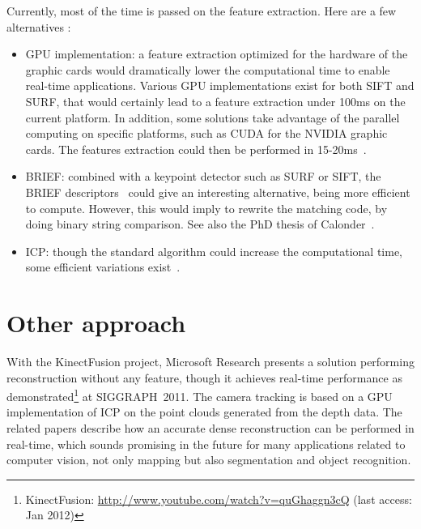 Currently, most of the time is passed on the feature extraction. Here are a few alternatives :
\begin{itemize}
\item GPU implementation: a feature extraction optimized for the hardware of the graphic cards would dramatically lower the computational time to enable real-time applications. Various GPU implementations exist for both SIFT and SURF, that would certainly lead to a feature extraction under 100ms on the current platform. In addition, some solutions take advantage of the parallel computing on specific platforms, such as CUDA\texttrademark{} for the NVIDIA graphic cards. The features extraction could then be performed in 15-20ms~\cite{bjorkman}.
\item BRIEF: combined with a keypoint detector such as \gls{SURF} or \gls{SIFT}, the \gls{BRIEF} descriptors~\cite{Calonder10-brief} could give an interesting alternative, being more efficient to compute. However, this would imply to rewrite the matching code, by doing binary string comparison. See also the PhD thesis of Calonder~\cite{Calonder10_PhD}.
\item ICP: though the standard algorithm could increase the computational time, some efficient variations exist~\cite{Rusinkiewicz_2001}. 
\end{itemize}

\section{Other approach}

With the KinectFusion project, Microsoft Research presents a solution performing reconstruction without any feature, though it achieves real-time performance as demonstrated\footnote{KinectFusion: \url{http://www.youtube.com/watch?v=quGhaggn3cQ} (last access: Jan 2012)} at SIGGRAPH~2011. The camera tracking is based on a GPU implementation of \gls{ICP} on the point clouds generated from the depth data. The related papers \cite{Izadi_2011_SIGGRAPH} \cite{Newcombe_2011_ISMAR} describe how an accurate dense reconstruction can be performed in real-time, which sounds promising in the future for many applications related to computer vision, not only mapping but also segmentation and object recognition.
